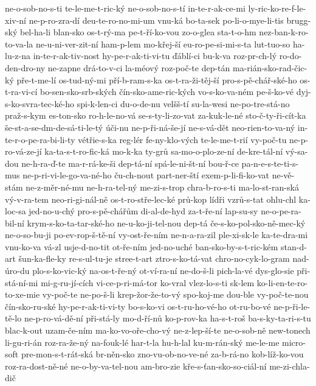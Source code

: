 {ne-o-sob-no-s-ti
te-le-me-t-ric-ký
ne-o-sob-no-s-tí
in-te-r-ak-ce-mi
ly-ric-ko-re-f-le-xiv-ní
ne-p-ro-zra-dí
deu-te-ro-no-mi-um
vnu-ká
bo-ta-sek
po-li-o-mye-li-tis
brugg-ský
bel-ha-li
blan-sko
os-t-rý-ma
pe-t-ří-ko-vou
zo-o-glea
sta-t-o-hm
nez-ban-k-ro-to-va-la
ne-u-ni-ver-zit-ní
ham-p-lem
mo-křej-ší
eu-ro-pe-si-mi-s-ta
lut-tuo-so
ha-lu-z-na
in-te-r-ak-tiv-nost
hy-pe-r-ak-ti-vi-tu
ďáblí-ci
bu-k-va
roz-pr-ch-lý
ro-do-den-dro-ny
ne-zapne
drá-to-v-ci
la-méový
roz-poč-te
dep-tán
ma-rián-sko-rad-čic-ký
pře-t-me-lí
os-tud-ný-mi
pří-b-ram-s-ka
os-t-ra-ži-těj-ší
pro-s-pě-chář-ské-ho
os-t-ra-vi-cí
bo-sen-sko-srb-ských
čín-sko-ame-ric-kých
vo-s-ko-va-ném
pe-š-ko-vé
dyj-s-ko-svra-tec-ké-ho
spi-k-len-ci
du-o-de-nu
velšš-tí
su-la-wesi
ne-po-tre-stá-no
praž-s-kym
es-ton-sko
ro-h-le-no-vá
se-s-ty-li-zo-vat
za-kuk-le-né
sto-č-ty-ři-cít-ka
še-st-a-se-dm-de-sá-ti-le-tý
úči-nu
ne-p-ři-ná-še-jí
ne-s-vá-dět
neo-rien-to-va-ný
in-te-r-o-pe-ra-bi-li-ty
vétřie-s-ka
reg-lér
fe-ny-klo-vých
te-le-me-t-rií
vy-poč-tu
ne-p-ro-vá-ze-jí
ka-ta-s-t-ro-fic-ká
mo-k-ka
ty-grů
sa-mo-o-plo-ze-ní
de-kre-tál-ní
vý-sa-dou
ne-h-ra-ď-te
ma-r-rá-ke-ši
dep-tá-ní
spá-le-ni-št-ní
bou-ř-ce
pa-n-e-s-te-ti-s-mus
ne-p-ri-vi-le-go-va-né-ho
ču-ch-nout
part-ner-ští
exem-p-li-fi-ko-vat
ne-vě-stám
ne-z-měr-né-mu
ne-h-ra-tel-ný
me-zi-s-trop
chra-b-ro-s-ti
ma-lo-st-ran-ská
vý-v-ra-tem
neo-ri-gi-nál-ně
os-t-ro-stře-lec-ké
prů-kop
lídři
vzrů-s-tat
ohlu-chl
ka-loc-sa
jed-no-u-chý
pro-s-pě-chářům
di-al-de-hyd
za-t-ře-ní
lap-su-sy
ne-o-pe-ra-bil-ní
krym-s-ko-ta-tar-ské-ho
ne-u-ko-ji-tel-nou
dep-tá
če-s-ko-pol-sko-ně-mec-ký
ne-o-so-bu-ji
po-ev-rop-š-tě-ní
vy-ost-ře-ním
ne-n-a-ra-zil
ple-xi-sk-le
ka-te-dra-mi
vnu-ko-va
vá-zl
usje-d-no-tit
ot-ře-ním
jed-no-uché
ban-sko-by-s-t-ric-kém
stan-d-art
šun-ka-fle-ky
re-s-ul-tu-je
stree-t-art
ztro-s-ko-tá-vat
chro-no-cyk-lo-gram
nad-úro-du
plo-s-ko-vic-ký
na-os-t-ře-ný
ot-ví-ra-ní
ne-do-š-li
pich-la-vé
dys-glo-sie
při-stá-ní-mi
mi-g-ru-jí-cích
vi-ce-p-ri-má-tor
ko-vral
vlez-lo-s-ti
sk-lem
ko-li-en-te-ro-to-xe-mie
vy-poč-te
ne-po-š-li
krep-žor-že-to-vý
spo-koj-me
dou-ble
vy-poč-te-nou
čín-sko-ru-ské
hy-pe-r-ak-ti-vi-ty
bo-s-ko-vi
os-t-ru-ho-vé-ho
ot-ru-bo-vé
ne-p-ři-le-tě-lo
ne-p-ro-vá-dě-ní
při-stá-ly
mo-d-ří-nů
ko-p-rov-ka
ha-s-t-roš
ba-s-ky-ta-ri-s-tu
blac-k-out
uzam-če-ním
ma-ko-vo-oře-cho-vý
ne-z-lep-ší-te
ne-o-sob-ně
new-tonech
li-gu-ri-án
roz-ra-že-ný
na-fouk-lé
har-t-la
hu-h-lal
ku-m-rán-ský
me-le-me
micro-soft
pre-mon-s-t-rát-ská
br-něn-sko
zno-vu-ob-no-ve-né
za-b-rá-no
kob-líž-ko-vou
roz-ra-dost-ně-né
ne-o-by-va-tel-nou
am-bro-zie
kře-s-ťan-sko-so-ciál-ní
me-zi-chla-dič
}
